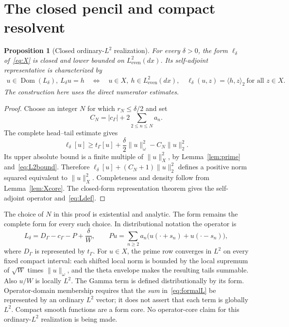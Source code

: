 \documentclass[11pt,a4paper]{article}
\numberwithin{equation}{section}
\newtheorem{proposition}[theorem]{Proposition}
\theoremstyle{remark}
\newcommand{\Le}{L^2_{\mathrm{even}}(dx)}
\newcommand{\tg}{t_{\Gamma}}
\newcommand{\cg}{c_{\Gamma}}
\newcommand{\dom}{\operatorname{Dom}}
\newcommand{\ip}[2]{\langle #1,#2\rangle}
\newcommand{\norm}[1]{\lVert #1\rVert}
\begin{document}
\section{The closed pencil and compact resolvent}\label{sec:pencil}

\begin{proposition}[Closed ordinary-$L^2$ realization]\label{prop:closedpencil}
For every $\delta>0$, the form $\ell_\delta$ of~\eqref{eq:X} is closed and lower bounded on $\Le$. Its self-adjoint representative is characterized by
\begin{equation}\label{eq:Ldef}
 \begin{split}
 u\in\dom(L_\delta),\ L_\delta u=h\quad\Longleftrightarrow\quad
 u\in X,\ h\in\Le,\quad
 \ell_\delta(u,z)=\ip{h}{z}_2\ \text{for all }z\in X.
 \end{split}
\end{equation}
The construction here uses the direct numerator estimates.
\end{proposition}
\begin{proof}
Choose an integer $N$ for which $r_N\le\delta/2$ and set
\[
 C_N=|\cg|+2\sum_{2\le n\le N}a_n.
\]
The complete head--tail estimate gives
\begin{equation}\label{eq:coercive}
 \ell_\delta[u]\ge\tg[u]+\frac\delta2\norm{u}_\omega^2-C_N\norm{u}_2^2.
\end{equation}
Its upper absolute bound is a finite multiple of $\norm{u}_X^2$, by Lemma~\ref{lem:prime} and~\eqref{eq:L2bound}. Therefore
$\ell_\delta[u]+(C_N+1)\norm{u}_2^2$ defines a positive norm squared equivalent to $\norm{u}_X^2$. Completeness and density follow from Lemma~\ref{lem:Xcore}. The closed-form representation theorem gives the self-adjoint operator and~\eqref{eq:Ldef}.
\end{proof}

The choice of $N$ in this proof is existential and analytic. The form remains the complete form for every such choice. In distributional notation the operator is
\begin{equation}\label{eq:formalL}
 L_\delta=D_\Gamma-\cg-P+\frac\delta W,
 \qquad
 Pu=\sum_{n\ge2}a_n\bigl(u(\cdot+s_n)+u(\cdot-s_n)\bigr),
\end{equation}
where $D_\Gamma$ is represented by $\tg$. For $u\in X$, the prime row converges in $L^2$ on every fixed compact interval: each shifted local norm is bounded by the local supremum of $\sqrt W$ times $\norm{u}_\omega$, and the theta envelope makes the resulting tails summable. Also $u/W$ is locally $L^2$. The Gamma term is defined distributionally by its form. Operator-domain membership requires that the \emph{sum} in~\eqref{eq:formalL} be represented by an ordinary $L^2$ vector; it does not assert that each term is globally $L^2$. Compact smooth functions are a form core. No operator-core claim for this ordinary-$L^2$ realization is being made.
\end{document}

